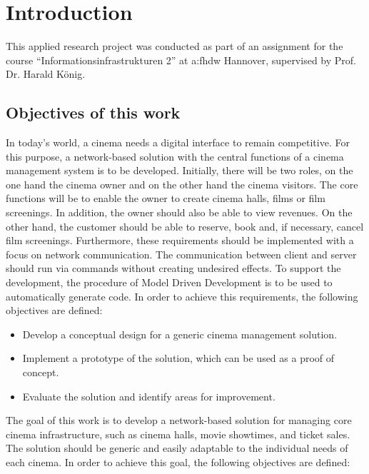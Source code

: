\chapter{Introduction}
\label{ch:intro}

This applied research project was conducted as part of an assignment for the course \enquote{Informationsinfrastrukturen 2} at \gls{a:fhdw} Hannover, supervised by Prof. Dr. Harald König.

\section{Objectives of this work}

In today's world, a cinema needs a digital interface to remain competitive. For this purpose, a network-based solution with the central functions of a cinema management system is to be developed. Initially, there will be two roles, on the one hand the cinema owner and on the other hand the cinema visitors. The core functions will be to enable the owner to create cinema halls, films or film screenings. In addition, the owner should also be able to view revenues. On the other hand, the customer should be able to reserve, book and, if necessary, cancel film screenings.
Furthermore, these requirements should be implemented with a focus on network communication. The communication between client and server should run via commands without creating undesired effects.
To support the development, the procedure of Model Driven Development is to be used to automatically generate code. In order to achieve this requirements, the following objectives are defined:

\begin{itemize}
    \item Develop a conceptual design for a generic cinema management solution.
    \item Implement a prototype of the solution, which can be used as a proof of concept.
    \item Evaluate the solution and identify areas for improvement.
\end{itemize}


The goal of this work is to develop a network-based solution for managing core cinema infrastructure, such as cinema halls, movie showtimes, and ticket sales. The solution should be generic and easily adaptable to the individual needs of each cinema. In order to achieve this goal, the following objectives are defined:


